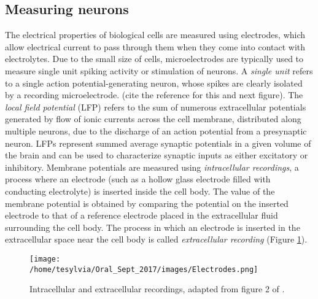 \subsection{Measuring neurons}
The electrical properties of biological cells are measured using electrodes, which allow electrical current to pass through them when they come into contact with electrolytes. Due to the small size of cells, microelectrodes are typically used to measure single unit spiking activity or stimulation of neurons.
A \textit{single unit} refers to a single action potential-generating neuron, whose spikes are clearly isolated by a recording microelectrode. (cite the reference for this and next figure).
The \textit{local field potential} (LFP) refers to the sum of numerous extracellular potentials generated by flow of ionic currents across the cell membrane, distributed along multiple neurons, due to the discharge of an action potential from a presynaptic neuron. LFPs represent summed average synaptic potentials in a given volume of the brain and can be used to characterize synaptic inputs as either excitatory or inhibitory.
Membrane potentials are measured using \textit{intracellular recordings}, a process where an electrode (such as a hollow glass electrode filled with conducting electrolyte) is inserted inside the cell body. The value of the membrane potential is obtained by comparing the potential on the inserted electrode to that of a reference electrode placed in the extracellular fluid surrounding the cell body.  The process in which an electrode is inserted in the extracellular space near the cell body is called \textit{extracellular recording} (Figure \ref{fig:Electrodes}).

\begin{figure}[h]
\centering
\texttt{[image: /home/tesylvia/Oral\_Sept\_2017/images/Electrodes.png]}
\caption{Intracellular and  extracellular recordings, adapted from figure 2 of \cite{Humphrey1990}.}
      \label{fig:Electrodes}
\end{figure}


